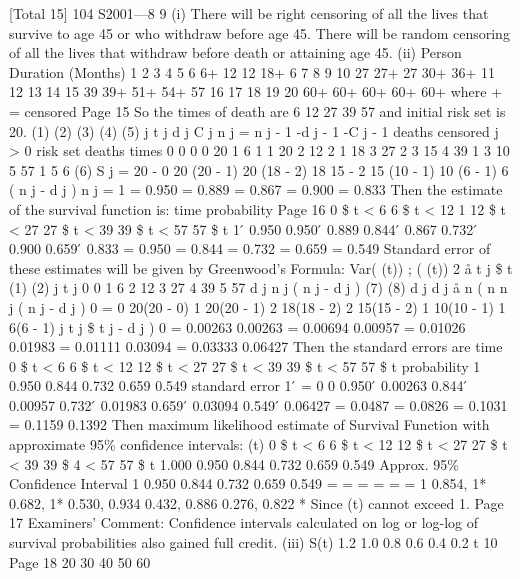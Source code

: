 \documentclass[a4paper,1pt]{article}
\begin{document}
[Total 15]
104 S2001—8
9
(i)
There will be right censoring of all the lives that survive to age 45 or
who withdraw before age 45.
There will be random censoring of all the lives that withdraw before
death or attaining age 45.
(ii)
Person Duration (Months)
1
2
3
4
5 6
6+
12
12
18+
6
7
8
9
10 27
27+
27
30+
36+
11
12
13
14
15 39
39+
51+
54+
57
16
17
18
19
20 60+
60+
60+
60+
60+
where + = censored
Page 15 %
So the times of death are 6 12 27 39 57 and initial risk set is 20.
(1) (2) (3) (4) (5)
j t j d j C j n j = n j - 1 -d j - 1 -C j - 1
deaths censored j > 0
risk set
deaths times
0 0 0 0 20
1 6 1 1 20
2 12 2 1 18
3 27 2 3 15
4 39 1 3 10
5 57 1 5 6
(6)
S j =
20 - 0
20
(20 - 1)
20
(18 - 2)
18
15 - 2
15
(10 - 1)
10
(6 - 1)
6
( n j - d j )
n j
= 1
= 0.950
= 0.889
= 0.867
= 0.900
= 0.833
Then the estimate of the survival function is:
time
probability
Page 16
0 \$ t < 6 6 \$ t < 12
1
12 \$ t < 27
27 \$ t < 39
39 \$ t < 57
57 \$ t
1  ́ 0.950 0.950  ́ 0.889 0.844  ́ 0.867 0.732  ́ 0.900 0.659  ́ 0.833
= 0.950
= 0.844
= 0.732
= 0.659
= 0.549 %
Standard error of these estimates will be given by Greenwood’s Formula:
Var( (t)) ; ( (t)) 2
å
t j \$ t
(1) (2)
j t j
0 0
1 6
2 12
3 27
4 39
5 57
d j
n j ( n j - d j )
(7)
(8)
d j
d j
å n ( n
n j ( n j - d j )
0
= 0
20(20 - 0)
1
20(20 - 1)
2
18(18 - 2)
2
15(15 - 2)
1
10(10 - 1)
1
6(6 - 1)
j
t j \$ t
j
- d j )
0
= 0.00263 0.00263
= 0.00694 0.00957
= 0.01026 0.01983
= 0.01111 0.03094
= 0.03333 0.06427
Then the standard errors are
time 0 \$ t < 6 6 \$ t < 12 12 \$ t < 27 27 \$ t < 39 39 \$ t < 57 57 \$ t
probability 1 0.950 0.844 0.732 0.659 0.549
standard
error
1  ́
= 0
0 0.950  ́ 0.00263 0.844  ́ 0.00957 0.732  ́ 0.01983 0.659  ́ 0.03094 0.549  ́ 0.06427
= 0.0487
= 0.0826
= 0.1031
= 0.1159
0.1392
Then maximum likelihood estimate of Survival Function with
approximate 95\% confidence intervals:
(t)
0 \$ t < 6
6 \$ t < 12
12 \$ t < 27
27 \$ t < 39
39 \$ 4 < 57
57 \$ t
1.000
0.950
0.844
0.732
0.659
0.549
Approx. 95\% Confidence Interval
1 
0.950 
0.844 
0.732 
0.659 
0.549 
=
=
=
=
=
=
1
0.854, 1*
0.682, 1*
0.530, 0.934
0.432, 0.886
0.276, 0.822
* Since (t) cannot exceed 1.
Page 17 %
Examiners’ Comment: Confidence intervals calculated on log or log-log of
survival probabilities also gained full credit.
(iii)
S(t)
1.2
1.0
0.8
0.6
0.4
0.2
t
10
Page 18
20
30
40
50
60
\end{document}
